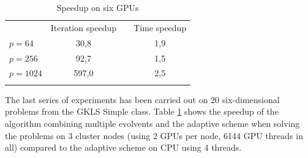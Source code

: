 \documentclass{svproc}
\begin{document}
\begin{table}[t]
                \caption{Speedup on six GPUs}
                \label{table:GKLS6_average_MMAS_GPU}
                \center
                \begin{tabular}{lccc}
                &  Iteration speedup & &   Time speedup \\
                               \noalign{\smallskip} \hline \noalign{\smallskip}                               
                               $p=64$  &    30,8	 & & 1,9	  \\
                               $p=256$ &    92,7	 & & 1,5  \\
							   $p=1024$&    597,0	 & & 2,5  \\
                               \noalign{\smallskip}\hline
                \end{tabular}
\end{table}


The last series of experiments has been carried out on 20 six-dimensional problems from the GKLS Simple class. 
Table \ref{table:GKLS6_average_MMAS_GPU} shows the speedup of the algorithm combining multiple evolvents and the adaptive scheme when solving the problems on 3 cluster nodes (using 2 GPUs per node, 6144 GPU threads in all) compared to the adaptive scheme on CPU using 4 threads.

\end{document}
